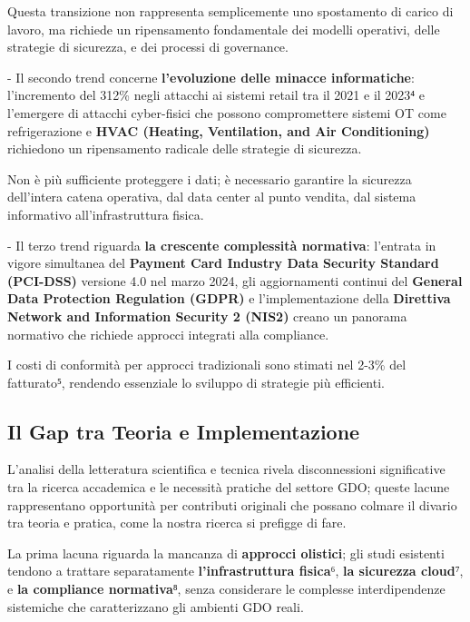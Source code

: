 \documentclass[12pt,a4paper,oneside]{book}
\begin{document}
Questa transizione non rappresenta semplicemente uno spostamento di
carico di lavoro, ma richiede un ripensamento fondamentale dei modelli
operativi, delle strategie di sicurezza, e dei processi di governance.

- Il secondo trend concerne \textbf{l'evoluzione delle minacce
informatiche}: l'incremento del 312\% negli attacchi ai sistemi retail
tra il 2021 e il 2023⁴ e l'emergere di attacchi cyber-fisici che possono
compromettere sistemi OT come refrigerazione e \textbf{HVAC (Heating,
Ventilation, and Air Conditioning)} richiedono un ripensamento radicale
delle strategie di sicurezza.

Non è più sufficiente proteggere i dati; è necessario garantire la
sicurezza dell'intera catena operativa, dal data center al punto
vendita, dal sistema informativo all'infrastruttura fisica.

- Il terzo trend riguarda \textbf{la crescente complessità normativa}:
l'entrata in vigore simultanea del \textbf{Payment Card Industry Data
Security Standard (PCI-DSS)} versione 4.0 nel marzo 2024, gli
aggiornamenti continui del \textbf{General Data Protection Regulation
(GDPR)} e l'implementazione della \textbf{Direttiva Network and
Information Security 2 (NIS2)} creano un panorama normativo che richiede
approcci integrati alla compliance.

I costi di conformità per approcci tradizionali sono stimati nel 2-3\%
del fatturato⁵, rendendo essenziale lo sviluppo di strategie più
efficienti.

\subsection{\texorpdfstring{\textbf{Il Gap tra Teoria e
Implementazione}}{1.1.3 Il Gap tra Teoria e Implementazione}}\label{il-gap-tra-teoria-e-implementazione}

L'analisi della letteratura scientifica e tecnica rivela disconnessioni
significative tra la ricerca accademica e le necessità pratiche del
settore GDO; queste lacune rappresentano opportunità per contributi
originali che possano colmare il divario tra teoria e pratica, come la nostra ricerca si prefigge di fare.

La prima lacuna riguarda la mancanza di \textbf{approcci olistici}; gli studi
esistenti tendono a trattare separatamente \textbf{l'infrastruttura fisica}⁶, \textbf{la
sicurezza cloud}⁷, e \textbf{la compliance normativa}⁸, senza considerare le
complesse interdipendenze sistemiche che caratterizzano gli ambienti GDO
reali.
\end{document}
